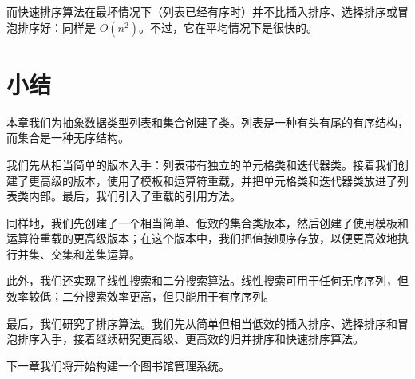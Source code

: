 而快速排序算法在最坏情况下（列表已经有序时）并不比插入排序、选择排序或冒泡排序好：同样是 $O(n^2)$。不过，它在平均情况下是很快的。

\section{小结}

本章我们为抽象数据类型列表和集合创建了类。列表是一种有头有尾的有序结构，而集合是一种无序结构。

我们先从相当简单的版本入手：列表带有独立的单元格类和迭代器类。接着我们创建了更高级的版本，使用了模板和运算符重载，并把单元格类和迭代器类放进了列表类内部。最后，我们引入了重载的引用方法。

同样地，我们先创建了一个相当简单、低效的集合类版本，然后创建了使用模板和运算符重载的更高级版本；在这个版本中，我们把值按顺序存放，以便更高效地执行并集、交集和差集运算。

此外，我们还实现了线性搜索和二分搜索算法。线性搜索可用于任何无序序列，但效率较低；二分搜索效率更高，但只能用于有序序列。

最后，我们研究了排序算法。我们先从简单但相当低效的插入排序、选择排序和冒泡排序入手，接着继续研究更高级、更高效的归并排序和快速排序算法。

下一章我们将开始构建一个图书馆管理系统。